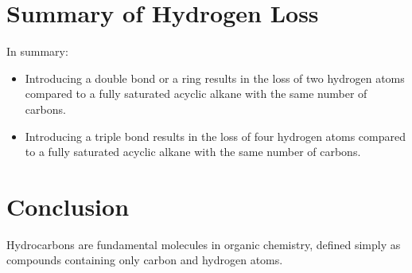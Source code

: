 \documentclass{article}
\begin{document}
\section{Summary of Hydrogen Loss}
In summary:
\begin{itemize}
    \item Introducing a double bond or a ring results in the loss of two hydrogen atoms compared to a fully saturated acyclic alkane with the same number of carbons.
    \item Introducing a triple bond results in the loss of four hydrogen atoms compared to a fully saturated acyclic alkane with the same number of carbons.
\end{itemize}

\section{Conclusion}
Hydrocarbons are fundamental molecules in organic chemistry, defined simply as compounds containing only carbon and hydrogen atoms.
\end{document}
